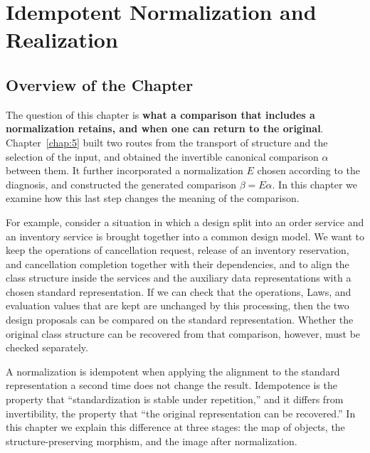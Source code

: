 \chapter{Idempotent Normalization and Realization}\label{chap:6}

\section*{Overview of the Chapter}

The question of this chapter is \textbf{what a comparison that includes a normalization
retains, and when one can return to the original}.
Chapter~\ref{chap:5} built two routes from the transport of structure and the selection of
the input, and obtained the invertible canonical comparison $\alpha$ between them.
It further incorporated a normalization $E$ chosen according to the diagnosis, and
constructed the generated comparison $\beta=E\alpha$.
In this chapter we examine how this last step changes the meaning of the comparison.

For example, consider a situation in which a design split into an order service and an
inventory service is brought together into a common design model.
We want to keep the operations of cancellation request, release of an inventory
reservation, and cancellation completion together with their dependencies, and to align the
class structure inside the services and the auxiliary data representations with a chosen
standard representation.
If we can check that the operations, Laws, and evaluation values that are kept are
unchanged by this processing, then the two design proposals can be compared on the standard
representation.
Whether the original class structure can be recovered from that comparison, however, must
be checked separately.

A normalization is idempotent when applying the alignment to the standard representation a
second time does not change the result.
Idempotence is the property that ``standardization is stable under repetition,'' and it
differs from invertibility, the property that ``the original representation can be
recovered.''
In this chapter we explain this difference at three stages: the map of objects, the
structure-preserving morphism, and the image after normalization.

